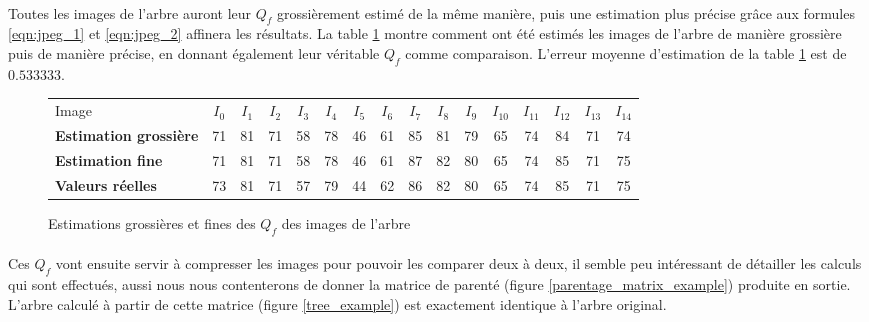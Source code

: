 \documentclass[utf8,final]{stageM2R} %
\begin{document}
\paragraph{}
Toutes les images de l'arbre auront leur $Q_f$ grossièrement estimé de la même manière, puis une estimation plus précise grâce aux formules \ref{eqn:jpeg_1} et \ref{eqn:jpeg_2} affinera les résultats. La table \ref{rough_fine} montre comment ont été estimés les images de l'arbre de manière grossière puis de manière précise, en donnant également leur véritable $Q_f$ comme comparaison. L'erreur moyenne d'estimation de la table \ref{rough_fine} est de $0.533333$.

\begin{figure}
  \begin{tabular}{|l||c|c|c|c|c|c|c|c|c|c|c|c|c|c|c|}
    \hline
      Image & $I_{0}$ & $I_{1}$ & $I_{2}$ & $I_{3}$ & $I_{4}$ & $I_{5}$ & $I_{6}$ & $I_{7}$ & $I_{8}$ & $I_{9}$ & $I_{10}$ & $I_{11}$ & $I_{12}$ & $I_{13}$ & $I_{14}$ \\ \hhline{|=::=|=|=|=|=|=|=|=|=|=|=|=|=|=|=|}
   
    \textbf{Estimation grossière}  & 71 & 81 & 71 & 58 & 78 & 46 & 61 & 85 & 81 & 79 & 65 & 74 & 84 & 71 & 74 \\ \hline
    \textbf{Estimation fine} & 71 & 81 & 71 & 58 & 78 & 46 & 61 & 87 & 82 & 80 & 65 & 74 & 85 & 71 & 75 \\ \hline
    \textbf{Valeurs réelles} & 73 & 81 & 71 & 57 & 79 & 44 & 62 & 86 & 82 & 80 & 65 & 74 & 85 & 71 & 75 \\ \hline
  \end{tabular}

  \caption{Estimations grossières et fines des $Q_f$ des images de l'arbre}
  \label{rough_fine}
\end{figure}

\paragraph{}
Ces $Q_f$ vont ensuite servir à compresser les images pour pouvoir les comparer deux à deux, il semble peu intéressant de détailler les calculs qui sont effectués, aussi nous nous contenterons de donner la matrice de parenté (figure \ref{parentage_matrix_example}) produite en sortie. L'arbre calculé à partir de cette matrice (figure \ref{tree_example}) est exactement identique à l'arbre original.
\end{document}
